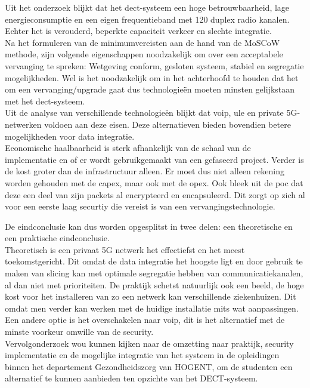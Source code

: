 Uit het onderzoek blijkt dat het \gls{dect}-systeem een  hoge betrouwbaarheid, lage energieconsumptie en een eigen frequentieband met 120 duplex radio kanalen. Echter het is verouderd,  beperkte capaciteit verkeer en slechte integratie. \\

Na het formuleren van de minimumvereisten aan de hand van de MoSCoW methode, zijn volgende eigenschappen noodzakelijk om over een acceptabele vervanging te spreken: Wetgeving conform, gesloten systeem, stabiel en segregatie mogelijkheden. Wel is het noodzakelijk om in het achterhoofd te houden dat het om een vervanging/upgrade gaat dus technologieën moeten minsten gelijkstaan met het \gls{dect}-systeem.\\
Uit de analyse van verschillende technologieën blijkt dat \gls{voip}, \gls{ule} en private 5G-netwerken voldoen aan deze eisen. Deze alternatieven bieden bovendien betere mogelijkheden voor data integratie.\\
Economische haalbaarheid is sterk afhankelijk van de schaal van de implementatie en of er wordt gebruikgemaakt van een gefaseerd project. Verder is de kost groter dan de infrastructuur alleen. Er moet dus niet alleen rekening worden gehouden met de \gls{capex}, maar ook met de \gls{opex}. 
Ook bleek uit de \gls{poc} dat deze een deel van zijn packets al encrypteerd en encapsuleerd. Dit zorgt op zich al voor een eerste laag securtiy die vereist is van een vervangingstechnologie.

De eindconclusie kan dus worden opgesplitst in twee delen: een theoretische en een praktische eindconclusie.\\
Theoretisch is een privaat 5G netwerk het effectiefst en het meest toekomstgericht. Dit omdat de data integratie het hoogste ligt en door gebruik te maken van slicing kan met optimale segregatie hebben van communicatiekanalen, al dan niet met prioriteiten. De praktijk schetst natuurlijk ook een beeld, de hoge kost voor het installeren van zo een netwerk kan verschillende ziekenhuizen. Dit omdat men verder kan werken met de huidige installatie mits wat aanpassingen. Een andere optie is het overschakelen naar \gls{voip}, dit is het alternatief met de minste voorkeur omwille van de security.\\

Vervolgonderzoek wou kunnen kijken naar de omzetting naar praktijk, security implementatie en de mogelijke integratie van het systeem in de opleidingen binnen het departement Gezondheidszorg van HOGENT, om de studenten een alternatief te kunnen aanbieden ten opzichte van het DECT-systeem.



